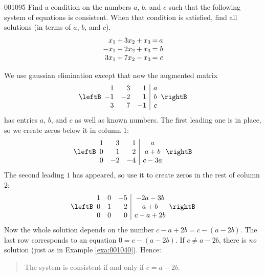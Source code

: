 \begin{example}{}{001095}
Find a condition on the numbers $a$, $b$, and $c$ such that the following system of equations is consistent. When that condition is satisfied, find all solutions (in terms of $a$, $b$, and $c$).
\begin{equation*}
\arraycolsep=1pt
\begin{array}{rlrlrcr}
	 x_1 & + & 3x_2 & + & x_3 & = & a \\
	-x_1 & - & 2x_2 & + & x_3 & = & b \\
	3x_1 & + & 7x_2 & - & x_3 & = & c
\end{array}
\end{equation*}
\begin{solution}
We use gaussian elimination except that now the augmented matrix
\begin{equation*}
\leftB
\begin{array}{rrr|c}
1 & 3 & 1 & a\\
-1 & -2 & 1 & b \\
3 & 7 & -1 & c
\end{array}
\rightB
\end{equation*}
has entries $a$, $b$, and $c$ as well as known numbers. The first leading one is in place, so we create zeros below it in column 1:
\begin{equation*}
\leftB \begin{array}{rrr|c}
1 &  3 & 1 & a \\
0 &  1 & 2 & a + b \\
0 & -2& -4 & c -3a
\end{array} \rightB
\end{equation*}
The second leading $1$ has appeared, so use it to create zeros in the rest of column 2:
\begin{equation*}
\leftB \begin{array}{rrr|c}
	1 &  0 & -5 & -2a - 3b \\
	0 &  1 & 2 & a + b \\
	0 &  0 & 0 & c - a + 2b
\end{array} \rightB
\end{equation*}
Now the whole solution depends on the number $c - a + 2b = c - (a - 2b)$. The last row corresponds to an equation $0 = c - (a - 2b)$. If $c \neq a - 2b$, there is \textit{no} solution (just as in Example \ref{exa:001040}). Hence:

\begin{quotation}

The system is consistent if and only if $c = a - 2b$.


\end{quotation}
\end{solution}
\end{example}
